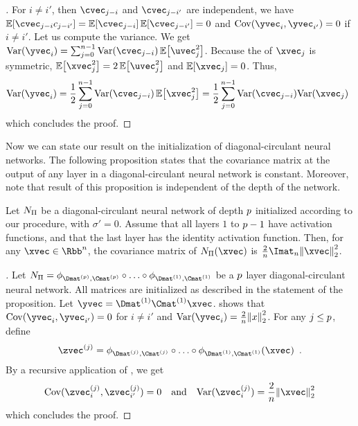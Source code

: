 \begin{proof}[]
  For $i \neq i'$, then $\cvec_{j-i}$ and $\cvec_{j-i'}$ are independent, we have $\Ebb\left[\cvec_{j-i}c_{j-i'}\right] = \Ebb\left[\cvec_{j-i}\right] \Ebb\left[\cvec_{j-i'}\right] = 0$ and $\Cov(\yvec_i,\yvec_{i'}) = 0$ if $i \neq i'$.
  Let us compute the variance.
  We get $\Var(\yvec_i) = \sum_{j=0}^{n-1} \Var(\cvec_{j-i}) \Ebb\left[\uvec_j^2\right]$.
  Because the \pdf of $\xvec_j$ is symmetric, $\Ebb\left[\xvec_j^2\right] = 2\Ebb\left[\uvec_j^2\right]$ and $\Ebb\left[\xvec_j\right] = 0$.
  Thus, 
  \begin{equation}
    \Var(\yvec_i) = \frac{1}{2} \sum_{j=0}^{n-1} \Var(\cvec_{j-i}) \Ebb\left[\xvec_j^2\right] = \frac{1}{2} \sum_{j=0}^{n-1} \Var(\cvec_{j-i}) \Var(\xvec_j) \enspace
  \end{equation}
  which concludes the proof.
\end{proof}

Now we can state our result on the initialization of diagonal-circulant neural networks.
The following proposition states that the covariance matrix at the output of any layer in a diagonal-circulant neural network is constant.
Moreover, note that result of this proposition is independent of the depth of the network.

\begin{proposition} \label{proposition:ch4-initialization_dcnn}
  Let $N_\Pi$ be a diagonal-circulant neural network of depth $p$ initialized according to our procedure, with $\sigma'=0$.
  Assume that all layers $1$ to $p-1$ have \relu activation functions, and that the last layer has the identity activation function.
  Then, for any $\xvec \in \Rbb^n$, the covariance matrix of $\nn_\Pi(\xvec)$ is $\frac{2}{n} \Imat_n \norm{\xvec}_2^2$.
\end{proposition}

\begin{proof}[]
  Let $\nn_\Pi = \layer_{\Dmat^{(\depth)}, \Cmat^{(\depth)}} \circ \ldots \circ \layer_{\Dmat^{(1)}, \Cmat^{(1)}}$ be a $p$ layer diagonal-circulant neural network.
  All matrices are initialized as described in the statement of the proposition.
  Let $\yvec = \Dmat^{(1)} \Cmat^{(1)} \xvec$.
   shows that $\Cov(\yvec_{i}, \yvec_{i'}) = 0$ for $i \neq i'$ and $\Var(\yvec_{i}) = \frac{2}{n}\norm{x}_{2}^{2}$.
  For any $j \le p$, define 
  \begin{equation}
    \zvec^{(j)} = \layer_{\Dmat^{(j)}, \Cmat^{(j)}} \circ \ldots \circ \layer_{\Dmat^{(1)}, \Cmat^{(1)}}(\xvec) \enspace.
  \end{equation}
  By a recursive application of , we get
  \begin{equation}
    \Cov(\zvec_i^{(j)}, \zvec_{i'}^{(j)}) = 0 \quad \text{and} \quad  \Var(\zvec_i^{(j)}) = \frac{2}{n} \norm{\xvec}_2^2
  \end{equation}
   which concludes the proof.
\end{proof}

